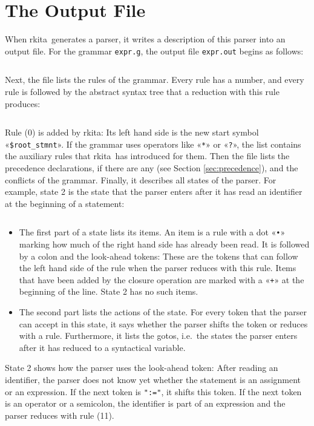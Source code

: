 \documentclass[11pt,a4paper]{article}
\makeatletter
\newcommand{\blue}[1]{{\color{blue}#1}}
\newcommand{\fakesc}[1]{\resizebox{!}{0.99ex}{\textls[90]{\MakeUppercase{#1}}}}
\def\@simtextsc#1#2\@nil{\MakeUppercase{#1}\fakesc{#2}}
\newcommand{\simtextsc}[1]{%
  \ifmmode\text{\@simtextsc#1\@nil}\else\@simtextsc#1\@nil\fi}
\newcommand{\Larkita}{\simtextsc{Larkita}}
\newenvironment{unbreakable}{\par\noindent\begin{minipage}{\linewidth}}{\end{minipage}\par}
\newcommand{\resultfile}[2][\normalsize]{\begin{unbreakable}%
  \inputminted[fontsize = #1, breaklines]{text}{examples/output/#2.txt}\end{unbreakable}}
\makeatother
\begin{document}
\section{The Output File}
\label{sec:output}
When \Larkita\ generates a parser, it writes a description of this parser into an output file.  For the
grammar \texttt{expr.g}, the output file \texttt{expr.out} begins as follows:
\resultfile[\small]{expr-header}
Next, the file lists the rules of the grammar.  Every rule has a number, and every rule is followed by the
abstract syntax tree that a reduction with this rule produces:
\resultfile[\small]{expr-rules}
Rule (0) is added by \Larkita: Its left hand side is the new start symbol «\verb|$root_stmnt|».  If the grammar
uses operators like «\verb|*|» or «\verb|?|», the list contains the auxiliary rules that \Larkita\ has introduced
for them.  Then the file lists the precedence declarations, if there are any (see Section
\ref{sec:precedence}), and the conflicts of the grammar.  Finally, it describes all states of the parser.  For example, state 2 is the state that the parser enters after it has read an
identifier at the beginning of a statement:
\resultfile[\small]{expr-state}
\begin{itemize}
\item The first part of a state lists its \blue{items}.  An item is a rule with a dot «\verb|•|» marking how
      much of the right hand side has already been read.  It is followed by a colon and the \blue{look-ahead
      tokens}: These are the tokens that can follow the left hand side of the rule when the parser reduces
      with this rule.  Items that have been added by the closure operation are marked with a «\verb|+|» at the
      beginning of the line.  State 2 has no such items.
\item The second part lists the \blue{actions} of the state.  For every token that the parser can accept in
      this state, it says whether the parser shifts the token or reduces with a rule.  Furthermore, it lists the
      \blue{gotos}, i.e.~the states the parser enters after it has reduced to a syntactical variable.
\end{itemize}
State 2 shows how the parser uses the look-ahead token: After reading an identifier, the parser does not
know yet whether the statement is an assignment or an expression.  If the next token is \verb|":="|, it
shifts this token.  If the next token is an operator or a semicolon, the identifier is part of an expression
and the parser reduces with rule (11).
\end{document}
